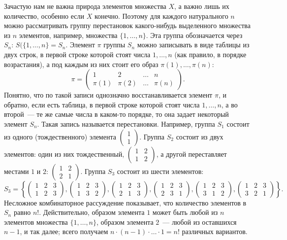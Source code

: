 Зачастую нам не важна природа элементов множества $X$, а важно лишь их
количество, особенно если $X$ конечно. Поэтому для каждого
натурального $n$ можно рассматривать
группу перестановок какого-нибудь выделенного множества из $n$
элементов, например, множества $\{1,\dots,n\}$. Эта группа
обозначается через $S_n$: $S(\{1,\dots,n\}=S_n$.
Элемент $\pi$ группы $S_n$ можно записывать в виде таблицы из двух
строк, в первой строке которой стоят числа $1,\dots,n$ (как правило, в
порядке возрастания), а под каждым
из них стоит его образ $\pi(1),\dots,\pi(n)$:
$$
\pi=\begin{pmatrix} 1 & 2 & \dots & n\\
\pi(1) & \pi(2) & \dots & \pi(n)\end{pmatrix}.
$$
Понятно, что по такой записи однозначно восстанавливается элемент
$\pi$, и обратно, если есть таблица, в первой строке которой стоят
числа $1,\dots,n$, а во второй~--- те же самые числа в каком-то
порядке, то она задает некоторый элемент $S_n$. Такая запись
называется  перестановки.
Например, группа $S_1$ состоит из одного (тождественного) элемента
$\left(\begin{matrix} 1 \\ 1\end{matrix}\right)$. Группа $S_2$ состоит
из двух элементов: один из них тождественный,
$\begin{pmatrix} 1 & 2\\ 1 & 2\end{pmatrix}$,
а другой переставляет местами $1$ и $2$:
$\begin{pmatrix} 1 & 2\\ 2 & 1\end{pmatrix}$. Группа $S_3$
состоит из шести элементов:
$$
S_3=\left\{\begin{pmatrix} 1 & 2 & 3\\ 1 & 2 & 3\end{pmatrix},
\begin{pmatrix} 1 & 2 & 3\\ 1 & 3 & 2\end{pmatrix},
\begin{pmatrix} 1 & 2 & 3\\ 2 & 1 & 3\end{pmatrix},
\begin{pmatrix} 1 & 2 & 3\\ 2 & 3 & 1\end{pmatrix},
\begin{pmatrix} 1 & 2 & 3\\ 3 & 1 & 2\end{pmatrix},
\begin{pmatrix} 1 & 2 & 3\\ 3 & 2 & 1\end{pmatrix}\right\}.
$$
Несложное комбинаторное рассуждение показывает, что количество
элементов в $S_n$ равно $n!$. Действительно, образом элемента $1$
может быть любой из $n$ элементов множества $\{1,\dots,n\}$, образом
элемента $2$~--- любой из оставшихся $n-1$, и так далее; всего
получаем $n\cdot (n-1)\cdot\dots\cdot 1=n!$ различных вариантов.

